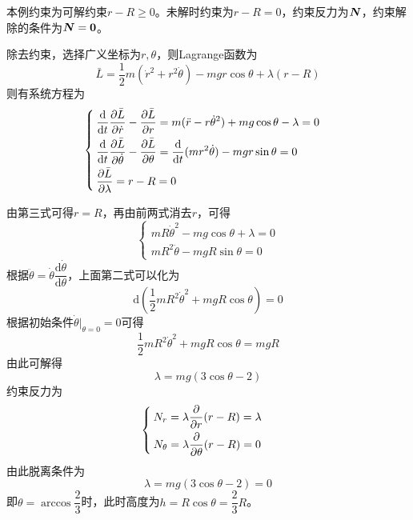 \begin{solution}
本例约束为可解约束$r - R \geqslant 0$。未解时约束为$r-R=0$，约束反力为$\boldsymbol{N}$，约束解除的条件为$\boldsymbol{N} = \boldsymbol{0}$。

除去约束，选择广义坐标为$r,\theta$，则Lagrange函数为
\begin{equation*}
	\bar{L} = \frac12 m(\dot{r}^2+r^2 \dot{\theta}) - mgr\cos \theta + \lambda(r-R)
\end{equation*}
则有系统方程为
\begin{equation*}
	\begin{cases}
		\displaystyle \frac{\mathrm{d}}{\mathrm{d} t} \frac{\partial \bar{L}}{\partial \dot{r}} - \frac{\partial \bar{L}}{\partial r} = m(\ddot{r} - r\dot{\theta}^2) + mg\cos \theta - \lambda = 0 \\[1.5ex]
		\displaystyle \frac{\mathrm{d}}{\mathrm{d} t} \frac{\partial \bar{L}}{\partial \dot{\theta}} - \frac{\partial \bar{L}}{\partial \theta} = \frac{\mathrm{d}}{\mathrm{d} t} (mr^2\dot{\theta}) - mgr\sin \theta = 0 \\[1.5ex]
		\displaystyle \frac{\partial \bar{L}}{\partial \lambda} = r-R = 0
	\end{cases}
\end{equation*}
\end{solution}
由第三式可得$r=R$，再由前两式消去$r$，可得
\begin{equation*}
	\begin{cases}
		mR\dot{\theta}^2 - mg\cos \theta + \lambda = 0 \\
		mR^2 \ddot{\theta} - mgR\sin \theta = 0
	\end{cases}
\end{equation*}
根据$\ddot{\theta} = \dot{\theta} \dfrac{\mathrm{d} \dot{\theta}}{\mathrm{d} \theta}$，上面第二式可以化为
\begin{equation*}
	\mathrm{d} \left(\frac12 mR^2 \dot{\theta}^2 + mgR\cos \theta\right) = 0
\end{equation*}
根据初始条件$\dot{\theta} \big|_{\theta=0} = 0$可得
\begin{equation*}
	\frac12 mR^2 \dot{\theta}^2 + mgR\cos \theta = mgR
\end{equation*}
由此可解得
\begin{equation*}
	\lambda = mg(3\cos \theta-2)
\end{equation*}
约束反力为
\begin{equation*}
	\begin{cases}
		N_r = \lambda \dfrac{\partial}{\partial r}(r-R) = \lambda \\[1.5ex]
		N_\theta = \lambda \dfrac{\partial}{\partial \theta}(r-R) = 0
	\end{cases}
\end{equation*}
由此脱离条件为
\begin{equation*}
	\lambda = mg(3\cos \theta-2) = 0
\end{equation*}
即$\theta = \arccos \dfrac23$时，此时高度为$h = R\cos \theta = \dfrac23 R$。

